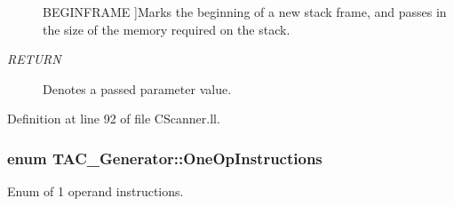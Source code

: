 \begin{Desc}
\begin{description}
{\hypertarget{classTAC__Generator_ab58b7044cb5d16a454f4e01514175123a2900d0c97873b8e4282491148b366771}{B\-E\-G\-I\-N\-F\-R\-A\-M\-E}\label{classTAC__Generator_ab58b7044cb5d16a454f4e01514175123a2900d0c97873b8e4282491148b366771}
}]Marks the beginning of a new stack frame, and passes in the size of the memory required on the stack. \item[{\em 
\hypertarget{classTAC__Generator_ab58b7044cb5d16a454f4e01514175123a0e868fa94bac0750a62dfa98d0f56510}{R\-E\-T\-U\-R\-N}\label{classTAC__Generator_ab58b7044cb5d16a454f4e01514175123a0e868fa94bac0750a62dfa98d0f56510}
}]Denotes a passed parameter value. \end{description}
\end{Desc}


Definition at line 92 of file C\-Scanner.\-ll.

\hypertarget{classTAC__Generator_ab58b7044cb5d16a454f4e01514175123}{
\subsubsection[{One\-Op\-Instructions}]{\setlength{\rightskip}{0pt plus 5cm}enum {\bf T\-A\-C\-\_\-\-Generator\-::\-One\-Op\-Instructions}}}\label{classTAC__Generator_ab58b7044cb5d16a454f4e01514175123}


Enum of 1 operand instructions. 

